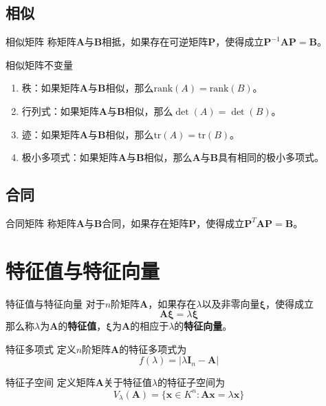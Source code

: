 \documentclass[lang = cn, scheme = chinese, thmcnt = section]{elegantbook}
\newcommand{\bs}{\boldsymbol}          %
\newcommand{\rank}{\text{rank}}        %
\newcommand{\tr}{\text{tr}}            %
\begin{document}
\subsection{相似}

\begin{definition}{相似矩阵}
	称矩阵$\bs{A}$与$\bs{B}$相抵，如果存在可逆矩阵$\bs{P}$，使得成立$\bs{P}^{-1}\bs{AP}=\bs{B}$。
\end{definition}

\begin{proposition}{相似矩阵不变量}
	\begin{enumerate}
		\item 秩：如果矩阵$\bs{A}$与$\bs{B}$相似，那么$\rank(A)=\rank(B)$。
		\item 行列式：如果矩阵$\bs{A}$与$\bs{B}$相似，那么$\det(A)=\det(B)$。
		\item 迹：如果矩阵$\bs{A}$与$\bs{B}$相似，那么$\tr(A)=\tr(B)$。
		\item 极小多项式：如果矩阵$\bs{A}$与$\bs{B}$相似，那么$\bs{A}$与$\bs{B}$具有相同的极小多项式。
	\end{enumerate}
\end{proposition}

\subsection{合同}

\begin{definition}{合同矩阵}
	称矩阵$\bs{A}$与$\bs{B}$合同，如果存在矩阵$\bs{P}$，使得成立$\bs{P}^{T}\bs{AP}=\bs{B}$。
\end{definition}

\section{特征值与特征向量}

\begin{definition}{特征值与特征向量}
	对于$n$阶矩阵$\bs{A}$，如果存在$\lambda$以及非零向量$\bs{\xi}$，使得成立
	$$
	\bs{A\xi}=\lambda\bs{\xi}
	$$
	那么称$\lambda$为$\bs{A}$的{\bf 特征值}，$\bs{\xi}$为$\bs{A}$的相应于$\lambda$的{\bf 特征向量}。
\end{definition}

\begin{definition}{特征多项式}
	定义$n$阶矩阵$\bs{A}$的特征多项式为
	$$
	f(\lambda)=|\lambda \bs{I}_n-\bs{A}|
	$$
\end{definition}

\begin{definition}{特征子空间}
	定义矩阵$\bs{A}$关于特征值$\lambda$的特征子空间为
	$$
	V_\lambda(\bs{A})=\{ \bs{x}\in K^{n}:\bs{A x}=\lambda\bs{x} \}
	$$
\end{definition}
\end{document}
